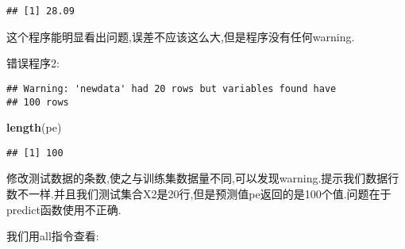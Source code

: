 \documentclass[]{ctexbook}
\newenvironment{Shaded}{\begin{snugshade}}{\end{snugshade}}
\newcommand{\DataTypeTok}[1]{\textcolor[rgb]{0.13,0.29,0.53}{#1}}
\newcommand{\DecValTok}[1]{\textcolor[rgb]{0.00,0.00,0.81}{#1}}
\newcommand{\FloatTok}[1]{\textcolor[rgb]{0.00,0.00,0.81}{#1}}
\newcommand{\KeywordTok}[1]{\textcolor[rgb]{0.13,0.29,0.53}{\textbf{#1}}}
\newcommand{\NormalTok}[1]{#1}
\newcommand{\OperatorTok}[1]{\textcolor[rgb]{0.81,0.36,0.00}{\textbf{#1}}}
\newcommand{\StringTok}[1]{\textcolor[rgb]{0.31,0.60,0.02}{#1}}
\begin{document}
\begin{verbatim}
## [1] 28.09
\end{verbatim}

这个程序能明显看出问题,误差不应该这么大,但是程序没有任何warning.

错误程序2:

\begin{Shaded}
\end{Shaded}

\begin{verbatim}
## Warning: 'newdata' had 20 rows but variables found have
## 100 rows
\end{verbatim}

\begin{Shaded}
\begin{Highlighting}[]
\KeywordTok{length}\NormalTok{(pe)}
\end{Highlighting}
\end{Shaded}

\begin{verbatim}
## [1] 100
\end{verbatim}

修改测试数据的条数,使之与训练集数据量不同,可以发现warning.提示我们数据行数不一样.并且我们测试集合X2是20行,但是预测值pe返回的是100个值.问题在于predict函数使用不正确.

我们用all指令查看:
\end{document}
